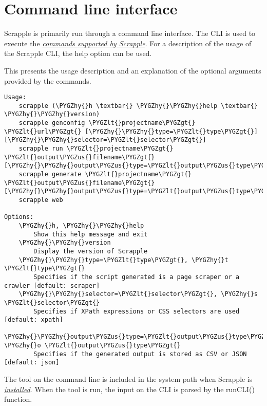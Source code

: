 \documentclass[letterpaper,12pt,english]{sphinxmanual}
\def\PYGZus{\char`\_}
\def\PYGZlt{\char`\<}
\def\PYGZgt{\char`\>}
\def\PYGZhy{\char`\-}
\begin{document}
\section{Command line interface}
\label{implementation/cli:implementation-cli}\label{implementation/cli:command-line-interface}\label{implementation/cli::doc}
Scrapple is primarily run through a command line interface. The CLI is used to execute the {\hyperref[framework/commands:framework-commands]{\emph{commands supported by Scrapple}}}. For a description of the usage of the Scrapple CLI, the help option can be used.


This presents the usage description and an explanation of the optional arguments provided by the commands.

\begin{Verbatim}[commandchars=\\\{\}]
Usage:
    scrapple (\PYGZhy{}h \textbar{} \PYGZhy{}\PYGZhy{}help \textbar{} \PYGZhy{}\PYGZhy{}version)
    scrapple genconfig \PYGZlt{}projectname\PYGZgt{} \PYGZlt{}url\PYGZgt{} [\PYGZhy{}\PYGZhy{}type=\PYGZlt{}type\PYGZgt{}] [\PYGZhy{}\PYGZhy{}selector=\PYGZlt{}selector\PYGZgt{}]
    scrapple run \PYGZlt{}projectname\PYGZgt{} \PYGZlt{}output\PYGZus{}filename\PYGZgt{} [\PYGZhy{}\PYGZhy{}output\PYGZus{}type=\PYGZlt{}output\PYGZus{}type\PYGZgt{}]
    scrapple generate \PYGZlt{}projectname\PYGZgt{} \PYGZlt{}output\PYGZus{}filename\PYGZgt{} [\PYGZhy{}\PYGZhy{}output\PYGZus{}type=\PYGZlt{}output\PYGZus{}type\PYGZgt{}]
    scrapple web

Options:
    \PYGZhy{}h, \PYGZhy{}\PYGZhy{}help
        Show this help message and exit
    \PYGZhy{}\PYGZhy{}version
        Display the version of Scrapple
    \PYGZhy{}\PYGZhy{}type=\PYGZlt{}type\PYGZgt{}, \PYGZhy{}t \PYGZlt{}type\PYGZgt{}
        Specifies if the script generated is a page scraper or a crawler [default: scraper]
    \PYGZhy{}\PYGZhy{}selector=\PYGZlt{}selector\PYGZgt{}, \PYGZhy{}s \PYGZlt{}selector\PYGZgt{}
        Specifies if XPath expressions or CSS selectors are used [default: xpath]
    \PYGZhy{}\PYGZhy{}output\PYGZus{}type=\PYGZlt{}output\PYGZus{}type\PYGZgt{}, \PYGZhy{}o \PYGZlt{}output\PYGZus{}type\PYGZgt{}
        Specifies if the generated output is stored as CSV or JSON [default: json]
\end{Verbatim}

The  tool on the command line is included in the system path when Scrapple is {\hyperref[intro/install:intro-install]{\emph{installed}}}. When the tool is run, the input on the CLI is parsed by the runCLI() function.
\end{document}
